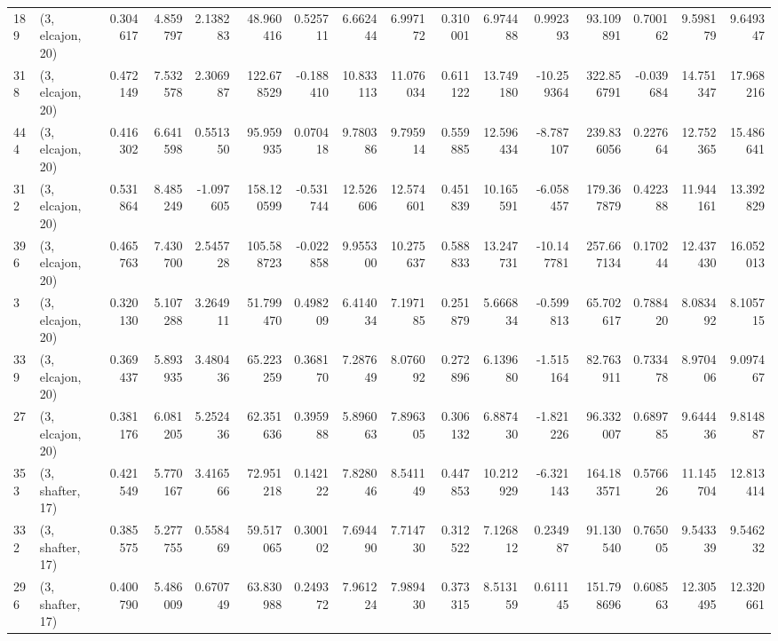 \begin{tabular}{llrrrrrrrrrrrrrr}
189 &  (3, elcajon, 20) &   0.304617 &   4.859797 &   2.138283 &    48.960416 &   0.525711 &   6.662444 &   6.997172 &  0.310001 &   6.974488 &   0.992393 &    93.109891 &  0.700162 &   9.598179 &   9.649347 \\
318 &  (3, elcajon, 20) &   0.472149 &   7.532578 &   2.306987 &   122.678529 &  -0.188410 &  10.833113 &  11.076034 &  0.611122 &  13.749180 & -10.259364 &   322.856791 & -0.039684 &  14.751347 &  17.968216 \\
444 &  (3, elcajon, 20) &   0.416302 &   6.641598 &   0.551350 &    95.959935 &   0.070418 &   9.780386 &   9.795914 &  0.559885 &  12.596434 &  -8.787107 &   239.836056 &  0.227664 &  12.752365 &  15.486641 \\
312 &  (3, elcajon, 20) &   0.531864 &   8.485249 &  -1.097605 &   158.120599 &  -0.531744 &  12.526606 &  12.574601 &  0.451839 &  10.165591 &  -6.058457 &   179.367879 &  0.422388 &  11.944161 &  13.392829 \\
396 &  (3, elcajon, 20) &   0.465763 &   7.430700 &   2.545728 &   105.588723 &  -0.022858 &   9.955300 &  10.275637 &  0.588833 &  13.247731 & -10.147781 &   257.667134 &  0.170244 &  12.437430 &  16.052013 \\
3   &  (3, elcajon, 20) &   0.320130 &   5.107288 &   3.264911 &    51.799470 &   0.498209 &   6.414034 &   7.197185 &  0.251879 &   5.666834 &  -0.599813 &    65.702617 &  0.788420 &   8.083492 &   8.105715 \\
339 &  (3, elcajon, 20) &   0.369437 &   5.893935 &   3.480436 &    65.223259 &   0.368170 &   7.287649 &   8.076092 &  0.272896 &   6.139680 &  -1.515164 &    82.763911 &  0.733478 &   8.970406 &   9.097467 \\
27  &  (3, elcajon, 20) &   0.381176 &   6.081205 &   5.252436 &    62.351636 &   0.395988 &   5.896063 &   7.896305 &  0.306132 &   6.887430 &  -1.821226 &    96.332007 &  0.689785 &   9.644436 &   9.814887 \\
353 &  (3, shafter, 17) &   0.421549 &   5.770167 &   3.416566 &    72.951218 &   0.142122 &   7.828046 &   8.541149 &  0.447853 &  10.212929 &  -6.321143 &   164.183571 &  0.576626 &  11.145704 &  12.813414 \\
332 &  (3, shafter, 17) &   0.385575 &   5.277755 &   0.558469 &    59.517065 &   0.300102 &   7.694490 &   7.714730 &  0.312522 &   7.126812 &   0.234987 &    91.130540 &  0.765005 &   9.543339 &   9.546232 \\
296 &  (3, shafter, 17) &   0.400790 &   5.486009 &   0.670749 &    63.830988 &   0.249372 &   7.961224 &   7.989430 &  0.373315 &   8.513159 &   0.611145 &   151.798696 &  0.608563 &  12.305495 &  12.320661 \\

\end{tabular}
